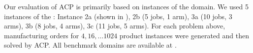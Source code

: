 %
Our evaluation of ACP is primarily based on 
instances of the {\ca} domain.
%
We used 5 instances of the {\ca}:
Instance 2a (shown in ),
2b (5 jobs, 1 arm),
3a (10 jobs, 3 arms),
3b (8 jobs, 4 arms),
3c (11 jobs, 5 arms).
For each problem above, manufacturing orders for $4,16,\ldots 1024$ product instances were generated and then solved by ACP.
 All benchmark domains are available at .



